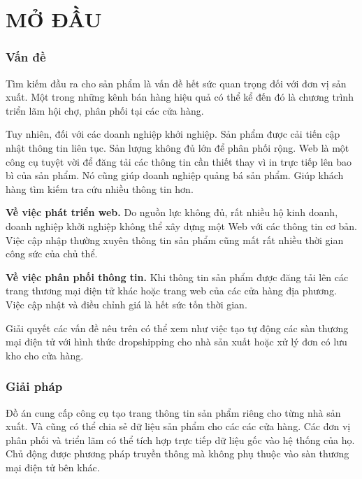 \fontsize{13px}{13px}\selectfont\justifying

\chapter*{MỞ ĐẦU}
\subsection*{Vấn đề}

Tìm kiếm đầu ra cho sản phẩm là vấn đề hết sức quan trọng đối với đơn vị sản xuất. Một trong những kênh bán hàng hiệu quả có thể kể đến đó là chương trình triển lãm hội chợ, phân phối tại các cửa hàng.

Tuy nhiên, đối với các doanh nghiệp khởi nghiệp. Sản phẩm được cải tiến cập nhật thông tin liên tục. Sản lượng không đủ lớn để phân phối rộng. Web là một công cụ tuyệt vời để đăng tải các thông tin cần thiết thay vì in trực tiếp lên bao bì của sản phẩm. Nó cũng giúp doanh nghiệp quảng bá sản phẩm. Giúp khách hàng tìm kiếm tra cứu nhiều thông tin hơn.

\textbf{Về việc phát triển web.}\label{pro:1} Do nguồn lực không đủ, rất nhiều hộ kinh doanh, doanh nghiệp khởi nghiệp không thể xây dựng một Web với các thông tin cơ bản. Việc cập nhập thường xuyên thông tin sản phẩm cũng mất rất nhiều thời gian công sức của chủ thể.

\textbf{Về việc phân phối thông tin.}\label{pro:2} Khi thông tin sản phẩm được đăng tải  lên các trang thương mại điện tử khác hoặc trang web của các cửa hàng địa phương. Việc cập nhật và điều chỉnh giá là hết sức tốn thời gian.

Giải quyết các vấn đề nêu trên có thể xem như việc tạo tự động các sàn thương mại điện tử với hình thức \gls{dropshipping} cho nhà sản xuất hoặc xử lý đơn có lưu kho cho cửa hàng.

%

\subsection*{Giải pháp}

Đồ án cung cấp công cụ tạo trang thông tin sản phẩm riêng cho từng nhà sản xuất. Và cũng có thể chia sẻ dữ liệu sản phẩm cho các các cửa hàng. Các đơn vị phân phối và triển lãm có thể tích hợp trực tiếp dữ liệu gốc vào hệ thống của họ. Chủ động được phương pháp truyền thông mà không phụ thuộc vào sàn thương mại điện tử bên khác.

